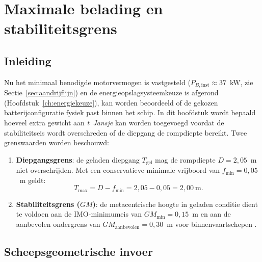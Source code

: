  
\chapter{Maximale belading en stabiliteitsgrens}
\label{ch:max-belading}
 
\section{Inleiding}
\label{sec:max-belading-inleiding}
 
Nu het minimaal benodigde motorvermogen is vastgesteld ($P_{B,\mathrm{inst}} \approx 37$~kW,
zie Sectie~\ref{sec:aandrijflijn}) en de energieopslagsysteemkeuze is afgerond
(Hoofdstuk~\ref{ch:energiekeuze}), kan worden beoordeeld of de gekozen batterijconfiguratie
fysiek past binnen het schip. In dit hoofdstuk wordt bepaald hoeveel extra gewicht aan
\emph{t~Jansje} kan worden toegevoegd voordat de stabiliteitseis wordt overschreden of de
diepgang de rompdiepte bereikt. Twee grenswaarden worden beschouwd:
 
\begin{enumerate}
    \item \textbf{Diepgangsgrens}: de geladen diepgang $T_\mathrm{gel}$ mag de rompdiepte
          $D = 2{,}05$~m niet overschrijden. Met een conservatieve minimale vrijboord van
          $f_\mathrm{min} = 0{,}05$~m geldt:
          \begin{equation}
              T_\mathrm{max} = D - f_\mathrm{min} = 2{,}05 - 0{,}05 = 2{,}00\ \mathrm{m}.
              \label{eq:Tmax}
          \end{equation}
    \item \textbf{Stabiliteitsgrens ($GM$)}: de metacentrische hoogte in geladen conditie
          dient te voldoen aan de IMO-minimumeis van $GM_\mathrm{min} = 0{,}15$~m
          \cite{IMO2008} en aan de aanbevolen ondergrens van $GM_\mathrm{aanbevolen} = 0{,}30$~m
          voor binnenvaartschepen \cite{CCR2015}.
\end{enumerate}
 
\section{Scheepsgeometrische invoer}
\label{sec:max-belading-invoer}
 
